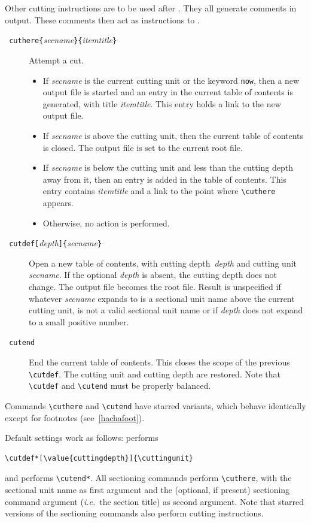 Other cutting instructions are to be used after
\verb++. They all generate \html{} comments in \hevea{}
output.
These comments then act as instructions to {\hacha}.
\begin{description}
\item[{\tt{} cuthere\{}{\it secname}{\tt\}\{}{\it itemtitle}{\tt\}}]
   Attempt a cut.
   \begin{itemize}
   \item If {\it secname} is the current cutting  unit or
   the keyword \texttt{now}, then
   a new output file is started and an entry in the current table of contents
   is generated, with title {\it itemtitle}. This entry holds a link
   to the new output file.
   \item If {\it secname} is above the cutting  unit, then the
   current table of contents is closed. The output file is set to the
   current root file.
   \item If {\it secname} is below the cutting  unit and less than the
   cutting depth away from it, then an entry is added in the table of
   contents.
   This entry contains {\em itemtitle} and a link to the point where
   \verb+\cuthere+ appears.
   \item Otherwise, no action is performed.
   \end{itemize}

\item[{\tt{} cutdef[}{\it depth}{\tt]\{}{\it secname}{\tt \}}]
   Open a new table of contents, with cutting depth~{\em depth} and
   cutting unit {\em secname}. If the optional {\em depth} is absent,
   the cutting depth does not change.
   The output file becomes the root file.
   Result is unspecified if whatever {\em secname} expands to is
   a sectional unit name above
   the current cutting  unit, is not a valid sectional unit name or if
   {\em depth} does not expand to a small positive number.
\item[{\tt{} cutend}]
   End the current table of contents. This closes the scope of the
   previous \verb+\cutdef+. The cutting unit and cutting depth are
   restored.
   Note that \verb+\cutdef+ and \verb+\cutend+ must be properly balanced.
\end{description}
Commands \verb+\cuthere+ and \verb+\cutend+ have starred variants,
which behave identically except for footnotes (see~\ref{hachafoot}).

Default settings work as follows:
\verb++ performs
\begin{verbatim}
\cutdef*[\value{cuttingdepth}]{\cuttingunit}
\end{verbatim}
and \verb++ performs \verb+\cutend*+.
All sectioning commands perform \verb+\cuthere+,
with the sectional unit name as first argument and the (optional, if
present) sectioning
command argument (\emph{i.e.}\ the section title) as second argument.
Note that starred versions of the sectioning commands also perform
cutting instructions.


